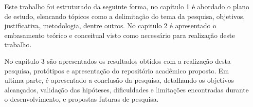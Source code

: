 Este trabalho foi estruturado da seguinte forma, no capítulo 1
é abordado o plano de estudo, elencando tópicos como a delimitação
do tema da pesquisa, objetivos, justificativa, metodologia, dentre outros.
No capitulo 2 é apresentado o embasamento teórico e conceitual
visto como necessário para realização deste trabalho.

No capítulo 3 são apresentados os resultados obtidos com a realização desta
pesquisa, protótipos e apresentação do repositório acadêmico proposto.
Em ultima parte, é apresentado a conclusão da pesquisa,
detalhando os objetivos alcançados, validação das hipóteses, dificuldades
e limitações encontradas durante o desenvolvimento, e propostas futuras
de pesquisa.